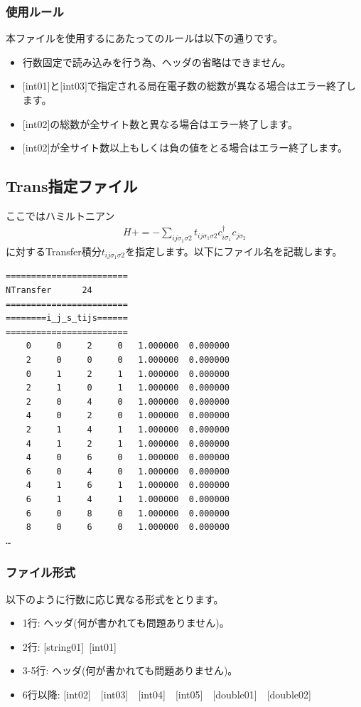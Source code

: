 \subsubsection{使用ルール}
本ファイルを使用するにあたってのルールは以下の通りです。
\begin{itemize}
\item 行数固定で読み込みを行う為、ヘッダの省略はできません。
\item $[$int01$]$と$[$int03$]$で指定される局在電子数の総数が異なる場合はエラー終了します。
\item $[$int02$]$の総数が全サイト数と異なる場合はエラー終了します。
\item $[$int02$]$が全サイト数以上もしくは負の値をとる場合はエラー終了します。
\end{itemize}


\newpage
\subsection{Trans指定ファイル}
\label{Subsec:Trans}
ここではハミルトニアン
\begin{align}
H +=-\sum_{ij\sigma_1\sigma2} t_{ij\sigma_1\sigma2}c_{i\sigma_1}^{\dag}c_{j\sigma_2}
\end{align}
に対するTransfer積分$t_{ij\sigma_1\sigma2}$を指定します。以下にファイル名を記載します。\\
\begin{minipage}{12.5cm}
\begin{screen}
\begin{verbatim}
======================== 
NTransfer      24  
======================== 
========i_j_s_tijs====== 
======================== 
    0     0     2     0   1.000000  0.000000
    2     0     0     0   1.000000  0.000000
    0     1     2     1   1.000000  0.000000
    2     1     0     1   1.000000  0.000000
    2     0     4     0   1.000000  0.000000
    4     0     2     0   1.000000  0.000000
    2     1     4     1   1.000000  0.000000
    4     1     2     1   1.000000  0.000000
    4     0     6     0   1.000000  0.000000
    6     0     4     0   1.000000  0.000000
    4     1     6     1   1.000000  0.000000
    6     1     4     1   1.000000  0.000000
    6     0     8     0   1.000000  0.000000
    8     0     6     0   1.000000  0.000000
…
\end{verbatim}
\end{screen}
\end{minipage}

\subsubsection{ファイル形式}
以下のように行数に応じ異なる形式をとります。
 \begin{itemize}
   \item  1行:  ヘッダ(何が書かれても問題ありません)。
   \item  2行:   [string01]~[int01]
   \item  3-5行:  ヘッダ(何が書かれても問題ありません)。
   \item  6行以降: [int02]~~[int03]~~[int04]~~[int05]~~[double01]~~[double02] 
  \end{itemize}
